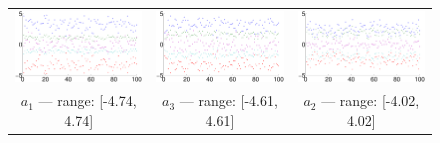 \begin{figure}[tbh]
\begin{center}
\begin{tabular}{ccc}
\includegraphics[scale=0.112]{fig/clusters.eps} &
\includegraphics[scale=0.112]{fig/clusters4.eps} &
\includegraphics[scale=0.112]{fig/clusters3.eps} \\
$a_1$ --- range: [-4.74, 4.74] & $a_3$ --- range: [-4.61, 4.61] & $a_2$ --- range: [-4.02, 4.02] \\

\end{tabular}
\end{center}
\end{figure}
